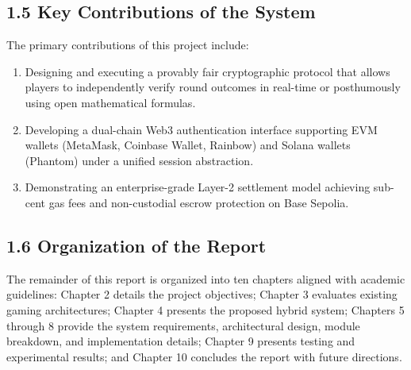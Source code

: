 \subsection*{1.5 Key Contributions of the System}
The primary contributions of this project include:
\begin{enumerate}[leftmargin=*]
    \item Designing and executing a provably fair cryptographic protocol that allows players to independently verify round outcomes in real-time or posthumously using open mathematical formulas.
    \item Developing a dual-chain Web3 authentication interface supporting EVM wallets (MetaMask, Coinbase Wallet, Rainbow) and Solana wallets (Phantom) under a unified session abstraction.
    \item Demonstrating an enterprise-grade Layer-2 settlement model achieving sub-cent gas fees and non-custodial escrow protection on Base Sepolia.
\end{enumerate}

\subsection*{1.6 Organization of the Report}
The remainder of this report is organized into ten chapters aligned with academic guidelines: Chapter 2 details the project objectives; Chapter 3 evaluates existing gaming architectures; Chapter 4 presents the proposed hybrid system; Chapters 5 through 8 provide the system requirements, architectural design, module breakdown, and implementation details; Chapter 9 presents testing and experimental results; and Chapter 10 concludes the report with future directions.
\label{chap:intro_end}
